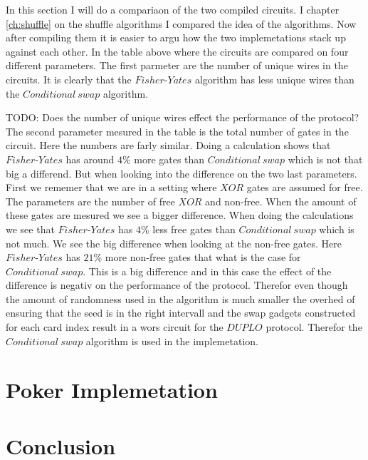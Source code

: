 \documentclass[twoside,11pt,openright]{report}
\newcommand{\todo}[1]{}
\renewcommand{\todo}[1]{{\color{red} TODO: {#1}} \\}
\begin{document}
In this section I will do a compariaon of the two compiled circuits. I chapter \ref{ch:shuffle} on the shuffle algorithms I compared the idea of the algorithms. Now after compiling them it is easier to argu how the two implemetations stack up against each other. In the table above where the circuits are compared on four different parameters. The first parmeter are the number of unique wires in the circuits. It is clearly that the $Fisher\text{-}Yates$ algorithm has less unique wires than the $Conditional~swap$ algorithm.

\todo{Does the number of unique wires effect the performance of the protocol?}

The second parameter mesured in the table is the total number of gates in the circuit. Here the numbers are farly similar. Doing a calculation shows that $Fisher\text{-}Yates$ has around $4\%$ more gates than $Conditional~swap$ which is not that big a differend. But when looking into the difference on the two last parameters. First we rememer that we are in a setting where $XOR$ gates are assumed for free. The parameters are the number of free $XOR$ and non-free. When the amount of these gates are mesured we see a bigger difference. When doing the calculations we see that $Fisher\text{-}Yates$ has $4\%$ less free gates than $Conditional~swap$ which is not much. We see the big difference when looking at the non-free gates. Here $Fisher\text{-}Yates$ has $21\%$ more non-free gates that what is the case for $Conditional~swap$. This is a big difference and in this case the effect of the difference is negativ on the performance of the protocol. Therefor even though the amount of randomness used in the algorithm is much smaller the overhed of ensuring that the seed is in the right intervall and the swap gadgets constructed for each card index result in a wors circuit for the $DUPLO$ protocol. Therefor the $Conditional~swap$ algorithm is used in the implemetation.

\chapter{Poker Implemetation}
\label{ch:implementation}



\chapter{Conclusion}
\label{ch:conclusion}

\end{document}
